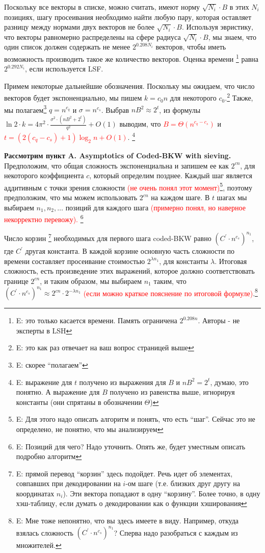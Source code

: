 \documentclass[a4paper,11pt]{article}
\begin{document}
Поскольку все векторы в списке, можно считать, имеют норму $\sqrt{N_i}\cdot B$ в этих $N_i$ позициях, шагу просеивания необходимо найти любую пару, которая оставляет разницу между нормами двух векторов не более $\sqrt{N_i}\cdot B$. Используя эвристику, что векторы равномерно распределены на сфере радиуса $\sqrt{N_i}\cdot B$, мы знаем, что один список должен содержать не менее $2^{0.208N_i }$ векторов, чтобы иметь возможность производить такое же количество векторов. Оценка времени \footnote{E: это только касается времени. Память ограничена $2^{0.208n }$. Авторы - не эксперты в LSH} равна $2^{0.292N_i}$, если используется LSF.

Примем некоторые дальнейшие обозначения. Поскольку мы ожидаем, что число векторов будет экспоненциально, мы пишем $k=c_0n$ для некоторого $c_0$.\footnote{E: это как раз отвечает на ваш вопрос страницей выше} Также, мы полагаем\footnote{E: скорее ``полагаем''} $q=n^{c_q}$ и $\sigma=n^{c_s}$. Выбрав $nB^2\approx2^t$, из формулы $\ln{2} \cdot k = 4\pi^2 \cdot \frac{\sigma^2 \cdot (nB^2+2^t)}{q^2} + O(1)$ выводим, что \textcolor{red}{$B=\Theta(n^{c_q-c_s})$} и \textcolor{red}{$t=(2(c_q-c_s)+1)\log_2 n + O(1)$}. \footnote{E: выражение для $t$ получено из выражения для $B$ и $nB^2 = 2^t$, думаю, это понятно. А выражение для $B$ получено из равенства выше, игнорируя константы (они спрятаны в обозначении $\Theta$)}

\textbf{Рассмотрим пункт A. Asymptotics of Coded-BKW with sieving.}\\

Предположим, что общая сложность экспоненциальна и запишем ее как $2^{cn}$, для некоторого коэффициента $c$, который определим позднее. Каждый шаг является аддитивным с точки зрения сложности \textcolor{red}{(не очень понял этот момент)}\footnote{E: Для этого надо описать алгоритм и понять, что есть ``шаг''. Сейчас это не определено, не понятно, что мы анализируем}, поэтому предположим, что мы можем использовать $2^{cn}$ на каждом шаге. В $t$ шагах мы выбираем $n_1,n_2,…$ позиций для каждого шага  \textcolor{red}{(примерно понял, но наверное некорректно перевожу). \footnote{E: Позиций для чего? Надо уточнить. Опять же, будет уместным описать подробно алгоритм}}

Число корзин \footnote{E: прямой перевод ``корзин'' здесь подойдет. Речь идет об элементах, совпавших при декодировании на $i$-ом шаге (т.е. близких друг другу на координатах $n_i$). Эти вектора попадают в одну ``корзину''. Более точно, в одну хэш-таблицу, если думать о декодировании как о функции хэширования} необходимых для первого шага coded-BKW равно $(C^{'} \cdot n^{c_s})^{n_1}$, где $C^{'}$ другая константа. В каждой корзине основную часть сложности по времени составляет просеивание стоимостью $2^{\lambda n_1}$, для константы $\lambda$. Итоговая сложность, есть произведение этих выражений, которое должно соответствовать границе $2^{cn}$, и таким образом, мы выбираем $n_1$ таким, что $(C^{'} \cdot n^{c_s})^{n_1} \approx 2^{cn} \cdot 2^{- \lambda n_1}$ \textcolor{red}{(если можно краткое пояснение по итоговой формуле)}.\footnote{E: Мне тоже непонятно, что вы здесь имеете в виду. Например, откуда взялась сложность $(C^{'} \cdot n^{c_s})^{n_1}$? Сперва надо разобраться с каждым из множителей.}
\end{document}

